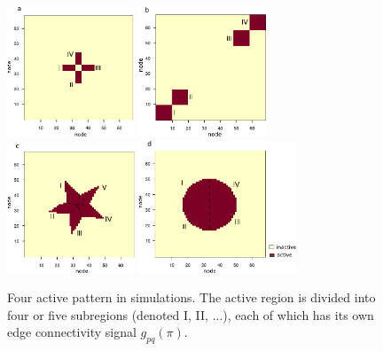 \documentclass[11pt]{article}
\theoremstyle{plain}
\theoremstyle{definition}
\begin{document}
\begin{figure}[ht]
    \centering
    \includegraphics[width=3.8cm]{cross.pdf}
      \includegraphics[width=3.8cm]{block.pdf}
        \includegraphics[width=3.8cm]{star.pdf}
          \includegraphics[width=4.7cm]{circle.pdf}
            
          \caption{Four active pattern in simulations. The active region is divided into four or five subregions (denoted I, II, ...), each of which has its own edge connectivity signal $g_{pq}(\pi)$.}\label{fig:region}
\end{figure}
\end{document}
